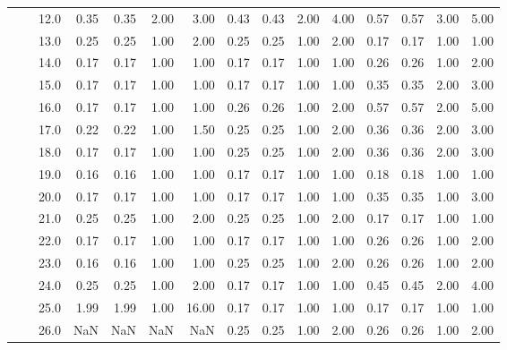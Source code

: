 \begin{tabular}{lllrrrrrrrrrrrr}
    &     & 12.0 &       0.35 &      0.35 & 2.00 &   3.00 &       0.43 &      0.43 & 2.00 &   4.00 &       0.57 &      0.57 & 3.00 &   5.00 \\
    &     & 13.0 &       0.25 &      0.25 & 1.00 &   2.00 &       0.25 &      0.25 & 1.00 &   2.00 &       0.17 &      0.17 & 1.00 &   1.00 \\
    &     & 14.0 &       0.17 &      0.17 & 1.00 &   1.00 &       0.17 &      0.17 & 1.00 &   1.00 &       0.26 &      0.26 & 1.00 &   2.00 \\
    &     & 15.0 &       0.17 &      0.17 & 1.00 &   1.00 &       0.17 &      0.17 & 1.00 &   1.00 &       0.35 &      0.35 & 2.00 &   3.00 \\
    &     & 16.0 &       0.17 &      0.17 & 1.00 &   1.00 &       0.26 &      0.26 & 1.00 &   2.00 &       0.57 &      0.57 & 2.00 &   5.00 \\
    &     & 17.0 &       0.22 &      0.22 & 1.00 &   1.50 &       0.25 &      0.25 & 1.00 &   2.00 &       0.36 &      0.36 & 2.00 &   3.00 \\
    &     & 18.0 &       0.17 &      0.17 & 1.00 &   1.00 &       0.25 &      0.25 & 1.00 &   2.00 &       0.36 &      0.36 & 2.00 &   3.00 \\
    &     & 19.0 &       0.16 &      0.16 & 1.00 &   1.00 &       0.17 &      0.17 & 1.00 &   1.00 &       0.18 &      0.18 & 1.00 &   1.00 \\
    &     & 20.0 &       0.17 &      0.17 & 1.00 &   1.00 &       0.17 &      0.17 & 1.00 &   1.00 &       0.35 &      0.35 & 1.00 &   3.00 \\
    &     & 21.0 &       0.25 &      0.25 & 1.00 &   2.00 &       0.25 &      0.25 & 1.00 &   2.00 &       0.17 &      0.17 & 1.00 &   1.00 \\
    &     & 22.0 &       0.17 &      0.17 & 1.00 &   1.00 &       0.17 &      0.17 & 1.00 &   1.00 &       0.26 &      0.26 & 1.00 &   2.00 \\
    &     & 23.0 &       0.16 &      0.16 & 1.00 &   1.00 &       0.25 &      0.25 & 1.00 &   2.00 &       0.26 &      0.26 & 1.00 &   2.00 \\
    &     & 24.0 &       0.25 &      0.25 & 1.00 &   2.00 &       0.17 &      0.17 & 1.00 &   1.00 &       0.45 &      0.45 & 2.00 &   4.00 \\
    &     & 25.0 &       1.99 &      1.99 & 1.00 &  16.00 &       0.17 &      0.17 & 1.00 &   1.00 &       0.17 &      0.17 & 1.00 &   1.00 \\
    &     & 26.0 &        NaN &       NaN &  NaN &    NaN &       0.25 &      0.25 & 1.00 &   2.00 &       0.26 &      0.26 & 1.00 &   2.00 \\

\end{tabular}
